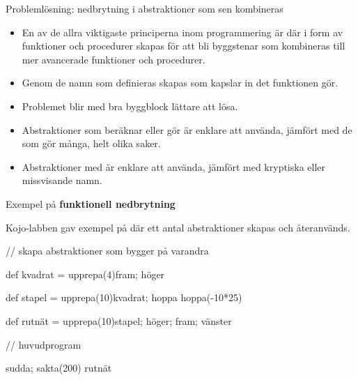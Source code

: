\begin{Slide}{Problemlösning: nedbrytning i abstraktioner som sen kombineras}\SlideFontSmall
\begin{itemize}
\item En av de allra viktigaste principerna inom programmering är  där   i form av funktioner och procedurer skapas för att bli byggstenar som kombineras till mer avancerade funktioner och procedurer.

\item Genom de namn som definieras skapas  som kapslar in det funktionen gör.

\item Problemet blir med bra byggblock lättare att lösa.

\item Abstraktioner som beräknar eller gör  är enklare att använda, jämfört med de som gör många, helt olika saker.

\item Abstraktioner med  är enklare att använda, jämfört med kryptiska eller missvisande namn.
\end{itemize}

\end{Slide}



\begin{Slide}{Exempel på \textbf{funktionell nedbrytning}}

Kojo-labben gav exempel på  där ett antal abstraktioner skapas och återanvänds.

\begin{Code}
// skapa abstraktioner som bygger på varandra

def kvadrat = upprepa(4){fram; höger}

def stapel = {
  upprepa(10){kvadrat; hoppa}
  hoppa(-10*25)
} 

def rutnät = upprepa(10){stapel; höger; fram; vänster}

// huvudprogram

sudda; sakta(200)
rutnät
\end{Code}
\end{Slide}


